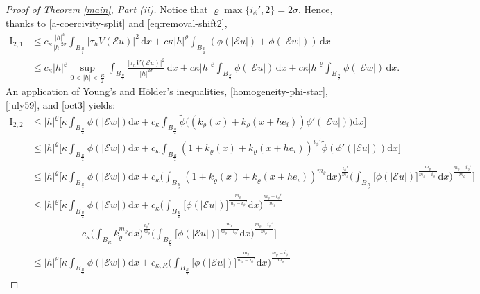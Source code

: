 \documentclass[leqno,11pt]{amsart}%
\numberwithin{equation}{section}
\def\d{\mathrm{d}}
\def\E{\mathcal{E}}
\def\dx{\d x}
\theoremstyle{definition}
\numberwithin{equation}{section}
\begin{document}
\begin{proof}[Proof of Theorem \ref{main}, Part (ii)]
 Notice that $\varrho\max\{i_\phi',2\}=2\sigma$. Hence, thanks to 
\eqref{a-coercivity-split} and \eqref{eq:removal-shift2}, 
\begin{align}\label{aug12}
    \mathrm{I_{2,1}}&\le 
   c_\kappa \frac{{|h|^{\varrho}}}{|h|^{2\sigma}} \int_{B_{\frac R2}}|\tau_hV(\E u)|^2\,\dx+c\kappa{|h|^{\varrho}}\int_{B_{\frac R2}}(\phi(|\E u|)+\phi(|\E w|))\,\dx \\ \nonumber
&\le 
 c_\kappa|h|^\varrho    \sup_{0<|h|<\frac R2}
 \int_{B_{\frac R2}}\frac{|\tau_hV(\E u)|^2}{|h|^{2\sigma}}\, \d x+ c\kappa{|h|^{\varrho}}\int_{B_{\frac R2}}\phi(|\E u|)\, \d x 
 +c\kappa|h|^{\varrho}\int_{B_{\frac R2}}\phi(|\E w|)\,\d x.
\end{align}
An application of Young's  and  H\"older's inequalities, \eqref{homogeneity-phi-star},   \eqref{july59}, and \eqref{oct3} yields:
   \begin{align}\label{aug11}
  \mathrm{I}_{2,2}
  &\le
    |h|^\varrho\Bigg[\kappa\int_{B_{\frac R2}}\phi(|\E w|)\dx
    +
    c_\kappa\int_{B_{\frac R2}}\widetilde \phi\Big({(k_\varrho(x)+k_\varrho(x+he_i))}\phi'(|\E u|)\Big)\dx\Bigg]\\
  &\le \nonumber 
    |h|^\varrho\Bigg[\kappa\int_{B_{\frac R2}}\phi(|\E w|)\dx
    +
    c_\kappa\int_{B_{\frac R2}}(1+{k_\varrho(x)+k_\varrho(x+he_i)})^{i_\phi'}\widetilde \phi(\phi'(|\E u|))\dx\Bigg]\\
  &\le \nonumber 
    |h|^\varrho\Bigg[\kappa\int_{B_{\frac R2}}\phi(|\E w|)\dx
    +
    c_\kappa\bigg(\int_{B_{\frac R2}}(1+k_\varrho(x)+k_\varrho(x+he_i))^{{m_\varrho}}\dx\bigg)^{\frac{i_\phi'}{{m_\varrho}}}
\bigg(\int_{B_{\frac R2}}\big[\phi(|\E u|)\big]^{\frac{ {m_\varrho}}{{m_\varrho}-i_\phi'}}\dx\bigg)^{\frac{ {m_\varrho}-i_\phi'}{{m_\varrho}}}\Bigg]
\\  &\le \nonumber 
    |h|^\varrho\Bigg[\kappa\int_{B_{\frac R2}}\phi(|\E w|)\dx
    +
    c_\kappa
\bigg(\int_{B_{\frac R2}}\big[\phi(|\E u|)\big]^{\frac{ {m_\varrho}}{ {m_\varrho}-i_\phi'}}\dx\bigg)^{\frac{{m_\varrho}-i_\phi'}{{m_\varrho}}}
\\ \nonumber & \qquad \qquad + c_\kappa\bigg(\int_{B_{R}}k_\varrho^{{m_\varrho}}\dx\bigg)^{\frac{i_\phi'}{{m_\varrho}}}\bigg(\int_{B_{\frac R2}}\big[\phi(|\E u|)\big]^{\frac{{m_\varrho}}{{m_\varrho}-i_\phi'}}\dx\bigg)^{\frac{{m_\varrho}-i_\phi'}{ {m_\varrho}}}
\Bigg]
\\  &\le \nonumber 
    {|h|^\varrho\Bigg[\kappa\int_{B_{\frac R2}}\phi(|\E w|)\dx
    +
    c_{\kappa,R}
\bigg(\int_{B_{\frac R2}}\big[\phi(|\E u|)\big]^{\frac{ {m_\varrho}}{{m_\varrho}-i_\phi'}}\dx\bigg)^{\frac{{m_\varrho}-i_\phi'}{ {m_\varrho}}}}

\end{align}
\end{proof}
\end{document}
